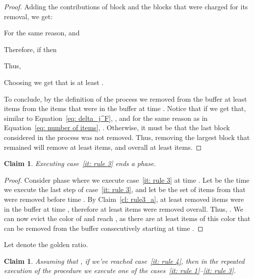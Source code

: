 \documentclass[11pt]{article}
\newtheorem{claim}[theorem]{Claim}
\begin{document}
\begin{proof}
Adding the contributions of block 
and the blocks that were charged for its removal, we get:

For the same reason,
 and

Therefore, if  then

Thus,

Choosing  we get that
 is at least .

To conclude, by the definition of the process we removed from
the buffer at least 
items from the items that were in the buffer at time .
Notice that if  we get that, similar to Equation~\eqref{eq: delta_j^F},
,
and for the same reason as in Equation~\eqref{eq: number of items},
.
Otherwise, it must be that the last block  considered in the process
was not removed. Thus, removing the largest block  that
remained will remove at least  items, and overall
at least 
items.
\end{proof}

\begin{claim}\label{cl: rule3_b}
Executing case~\ref{it: rule 3} ends a phase.
\end{claim}

\begin{proof}
Consider phase  where we execute case~\ref{it: rule 3}
at time .
Let  be the time we execute the last step of
case~\ref{it: rule 3},
and let  be the set of items from  that were removed
before time . By Claim~\ref{cl: rule3_a}, at least 
removed items were in the buffer at time ,
therefore at least  items were removed overall.
Thus, . We can now evict the color of 
and reach , as there are at least
 items
of this color that can be removed from the buffer consecutively
starting at time .
\end{proof}

Let  denote
the golden ratio.
\begin{claim}\label{cl: rule 4}
Assuming that ,
if we've reached case~\ref{it: rule 4}, then in the repeated
execution of the procedure we execute one of the
cases~\ref{it: rule 1}--\ref{it: rule 3}.
\end{claim}
\end{document}
